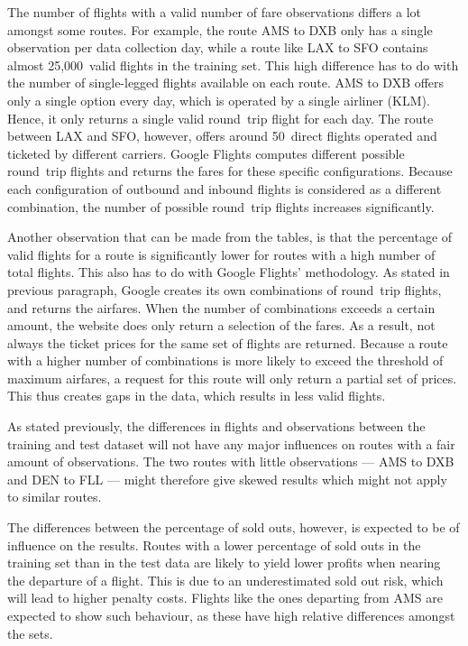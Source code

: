 The number of flights with a valid number of fare observations differs a lot amongst some routes. For example, the route AMS to DXB only has a single observation per data collection day, while a route like LAX to SFO contains almost 25,000~valid flights in the training set. This high difference has to do with the number of single-legged flights available on each route. AMS to DXB offers only a single option every day, which is operated by a single airliner (KLM). Hence, it only returns a single valid round~trip flight for each day. The route between LAX and SFO, however, offers around 50~direct flights operated and ticketed by different carriers. Google Flights computes different possible round~trip flights and returns the fares for these specific configurations. Because each configuration of outbound and inbound flights is considered as a different combination, the number of possible round~trip flights increases significantly.

Another observation that can be made from the tables, is that the percentage of valid flights for a route is significantly lower for routes with a high number of total flights. This also has to do with Google Flights' methodology. As stated in previous paragraph, Google creates its own combinations of round~trip flights, and returns the airfares. When the number of combinations exceeds a certain amount, the website does only return a selection of the fares. As a result, not always the ticket prices for the same set of flights are returned. Because a route with a higher number of combinations is more likely to exceed the threshold of maximum airfares, a request for this route will only return a partial set of prices. This thus creates gaps in the data, which results in less valid flights.

As stated previously, the differences in flights and observations between the training and test dataset will not have any major influences on routes with a fair amount of observations. The two routes with little observations --- AMS to DXB and DEN to FLL --- might therefore give skewed results which might not apply to similar routes.

The differences between the percentage of sold outs, however, is expected to be of influence on the results. Routes with a lower percentage of sold outs in the training set than in the test data are likely to yield lower profits when nearing the departure of a flight. This is due to an underestimated sold out risk, which will lead to higher penalty costs. Flights like the ones departing from AMS are expected to show such behaviour, as these have high relative differences amongst the sets.

